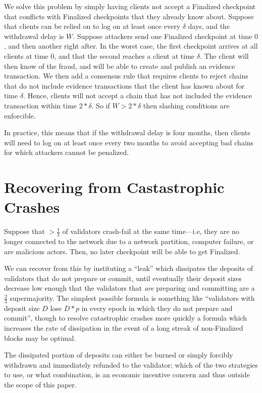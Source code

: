 \documentclass[12pt]{article}
\begin{document}
We solve this problem by simply having clients not accept a Finalized checkpoint that conflicts with Finalized checkpoints that they already know about. Suppose that clients can be relied on to log on at least once every $\delta$ days, and the withdrawal delay is $W$. Suppose attackers send one Finalized checkpoint at time $0$, and then another right after. In the worst case, the first checkpoint arrives at all clients at time $0$, and that the second reaches a client at time $\delta$. The client will then know of the fraud, and will be able to create and publish an evidence transaction. We then add a consensus rule that requires clients to reject chains that do not include evidence transactions that the client has known about for time $\delta$. Hence, clients will not accept a chain that has not included the evidence transaction within time $2 * \delta$. So if $W > 2 * \delta$ then slashing conditions are enforcible.

In practice, this means that if the withdrawal delay is four months, then clients will need to log on at least once every two months to avoid accepting bad chains for which attackers cannot be penalized. 

\section{Recovering from Castastrophic Crashes}
\label{sect:leak}

Suppose that $>\frac{1}{3}$ of validators crash-fail at the same time---i.e, they are no longer connected to the network due to a network partition, computer failure, or are malicious actors. Then, no later checkpoint will be able to get Finalized.

We can recover from this by instituting a ``leak'' which dissipates the deposits of validators that do not prepare or commit, until eventually their deposit sizes decrease low enough that the validators that \textit{are} preparing and committing are a $\frac{2}{3}$ supermajority. The simplest possible formula is something like ``validators with deposit size $D$ lose $D * p$ in every epoch in which they do not prepare and commit'', though to resolve catastrophic crashes more quickly a formula which increases the rate of dissipation in the event of a long streak of non-Finalized blocks may be optimal.

The dissipated portion of deposits can either be burned or simply forcibly withdrawn and immediately refunded to the validator; which of the two strategies to use, or what combination, is an economic incentive concern and thus outside the scope of this paper.
\end{document}
